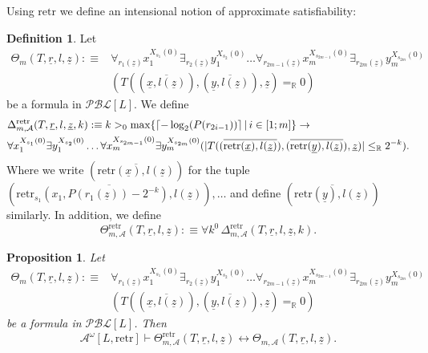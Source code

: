 \documentclass[11pt]{amsart}
\newtheorem{proposition}[theorem]{Proposition}
\theoremstyle{definition}
\newtheorem{definition}[theorem]{Definition}
\theoremstyle{remark}
\DeclarePairedDelimiter{\ceil}{\lceil}{\rceil}
\def\RR{\mathbb{R}}
\begin{document}
Using $\mathrm{retr}$ we define an intensional notion of approximate satisfiability:

\begin{definition}
    Let
\begin{align*}
    \Theta_m(T,\underline{r},l,\underline{z}):\equiv &\forall_{r_1(\underline{z})} x_1^{X_{s_1}(0)} \exists_{r_2(\underline{z})} y_1^{X_{s_2}(0)} \ldots \forall_{r_{2m-1}(\underline{z})} x_m^{X_{s_{2m-1}}(0)}\exists_{r_{2m}(\underline{z})} y_m^{X_{s_{2m}}(0)}\\&(T((\overline{\underline{x},l(\underline{z})}),(\overline{\underline{y},l(\underline{z})}),\underline{z})=_\RR 0)
\end{align*}
be a formula in $\mathcal{PBL}[L]$. We define
 \begin{align*}
          &\Delta^\mathrm{retr}_{m,\mathcal{A}}(T,\underline{r},l,\underline{z},k):\equiv k>_0\max\{\ceil{-\log_2(P(r_{2i-1}))}\,|\, i \in [1;m]\} \to\\ &\forall x_1^{X_{s_1}(0)} \exists y_1^{X_{s_2}(0)} \ldots \forall x_m^{X_{s_{2m-1}}(0)}\exists y_m^{X_{s_{2m}}(0)}(|T((\overline{\mathrm{retr}(\underline{x}),l(\underline{z})}),(\overline{\mathrm{retr}(\underline{y}),l(\underline{z})}),\underline{z})|\le_\RR 2^{-k}).
    \end{align*} 
Where we write $(\overline{\mathrm{retr}(\underline{x}),l(\underline{z})})$ for the tuple $(\overline{\mathrm{retr}_{s_1}(x_1,P(r_1(\underline{z}))-2^{-k}),l(\underline{z})}),\ldots$ and define  $(\overline{\mathrm{retr}(\underline{y}),l(\underline{z})})$ similarly. In addition, we define
\[
\Theta^\mathrm{retr}_{m,\mathcal{A}}(T,\underline{r},l,\underline{z}):\equiv \forall k^0\,\Delta^\mathrm{retr}_{m,\mathcal{A}}(T,\underline{r},l,\underline{z},k).
\]
\end{definition}
\begin{proposition}
\label{prop:ext:approx}
    Let
\begin{align*}
    \Theta_m(T,\underline{r},l,\underline{z}):\equiv &\forall_{r_1(\underline{z})} x_1^{X_{s_1}(0)} \exists_{r_2(\underline{z})} y_1^{X_{s_2}(0)} \ldots \forall_{r_{2m-1}(\underline{z})} x_m^{X_{s_{2m-1}}(0)}\exists_{r_{2m}(\underline{z})} y_m^{X_{s_{2m}}(0)}\\&(T((\overline{\underline{x},l(\underline{z})}),(\overline{\underline{y},l(\underline{z})}),\underline{z})=_\RR 0)
\end{align*}
be a formula in $\mathcal{PBL}[L]$. Then
\[
\mathcal{A}^\omega[L,\mathrm{retr}]\vdash \Theta^\mathrm{retr}_{m,\mathcal{A}}(T,\underline{r},l,\underline{z}) \leftrightarrow \Theta_{m,\mathcal{A}}(T,\underline{r},l,\underline{z}).
\]
\end{proposition}
\end{document}

